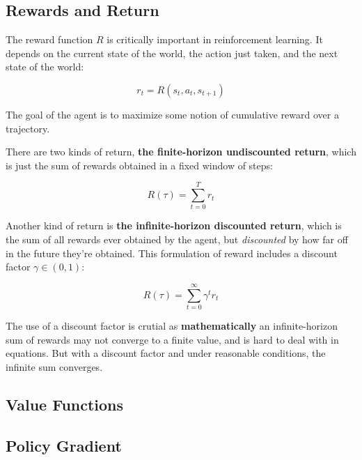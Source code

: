 \subsection{Rewards and Return}

The reward function \(R\) is critically important in reinforcement learning. It depends on the current state of the world, the action just taken, and the next state of the world:

\begin{center}
	\begin{equation}
		r_{t}=R\left(s_{t}, a_{t}, s_{t+1}\right)
	\end{equation}
\end{center}

The goal of the agent is to maximize some notion of cumulative reward over a trajectory.

There are two kinds of return, \textbf{the finite-horizon undiscounted return}, which is just the sum of rewards obtained in a fixed window of steps:

\begin{center}
	\begin{equation} \label{eq:1}
		R(\tau)=\sum_{t=0}^{T} r_{t}
	\end{equation}
\end{center}

Another kind of return is \textbf{the infinite-horizon discounted return}, which is the sum of all rewards ever obtained by the agent, but \textit{discounted} by how far off in the future they’re obtained. This formulation of reward includes a discount factor \(\gamma \in(0,1)\):

\begin{center}
	\begin{equation} \label{eq:2}
		R(\tau)=\sum_{t=0}^{\infty} \gamma^{t} r_{t}
	\end{equation}
\end{center}

The use of a discount factor is crutial as \textbf{mathematically} an infinite-horizon sum of rewards may not converge to a finite value, and is hard to deal with in equations. But with a discount factor and under reasonable conditions, the infinite sum converges.


\subsection{Value Functions}
\subsection{Policy Gradient}
